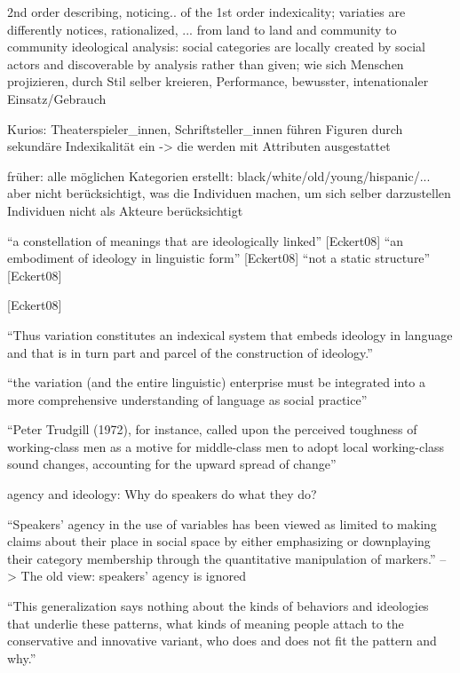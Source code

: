 2nd order
describing, noticing.. of the 1st order indexicality;
variaties are differently notices, rationalized, ... from land to land and community to community
ideological analysis: social categories are locally created by social actors and discoverable by analysis rather than given;
wie sich Menschen projizieren, durch Stil selber kreieren, Performance, bewusster, intenationaler Einsatz/Gebrauch

Kurios: Theaterspieler\_innen, Schriftsteller\_innen führen Figuren durch sekundäre Indexikalität ein -> die werden mit Attributen ausgestattet

früher: alle möglichen Kategorien erstellt: black/white/old/young/hispanic/...
aber nicht berücksichtigt, was die Individuen machen, um sich selber darzustellen
Individuen nicht als Akteure berücksichtigt


``a constellation of meanings that are ideologically linked'' [Eckert08]
``an embodiment of ideology in linguistic form'' [Eckert08]
``not a static structure'' [Eckert08]

[Eckert08]

``Thus variation constitutes an indexical system
that embeds ideology in language and that is in turn part and parcel of the
construction of ideology.''

``the variation (and the entire linguistic) enterprise must
be integrated into a more comprehensive understanding of language as social
practice''

``Peter Trudgill
(1972), for instance, called upon the perceived toughness of working-class men
as a motive for middle-class men to adopt local working-class sound changes,
accounting for the upward spread of change''

agency and ideology: Why do speakers do what they do?

``Speakers’ agency in the use of variables has
been viewed as limited to making claims about their place in social space by
either emphasizing or downplaying their category membership through the
quantitative manipulation of markers.''
--> The old view: speakers' agency is ignored

``This generalization says nothing about the kinds of behaviors and ideologies that
underlie these patterns, what kinds of meaning people attach to the conservative
and innovative variant, who does and does not fit the pattern and why.''


